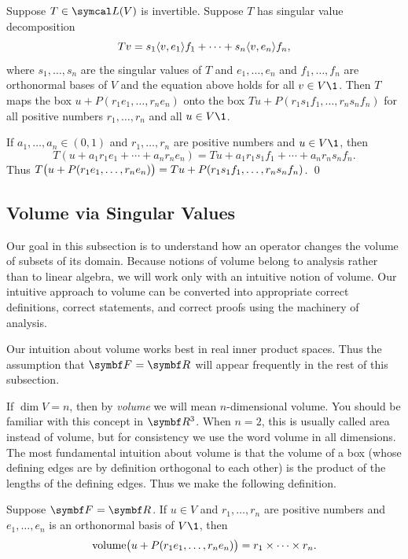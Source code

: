 \pagebreak[3]

{Suppose $T \in \L(V)$ is invertible. Suppose $T$ has singular value decomposition
\[
Tv = s_1 \ip{v, e_1} f_1 + \cdots + s_n \ip{v, e_n} f_n,
\]
where $s_1, \ldots, s_n$ are the singular values of $T$ and $e_1, \ldots, e_n$ and $f_1, \ldots, f_n$ are orthonormal bases of $V$ and the equation above holds for all $v \in V\1$. Then $T$ maps the box $u + P(r_1 e_1, \ldots, r_ne_n)$ onto the box
$Tu + P(r_1 s_1 f_1, \ldots, r_n s_n f_n)$ for all positive numbers $r_1, \ldots, r_n$ and all $u \in V\1$.}

\proof
If $a_1, \ldots, a_n \in (0, 1)$ and $r_1, \ldots, r_n$ are positive numbers and $u \in V\1$, then
\[
T(u + a_1 r_1  e_1 + \cdots + a_n r_n e_n) = Tu + a_1 r_1 s_1 f_1 + \cdots + a_n r_n s_n f_n.
\]
Thus  $T \paren[\big]{ u + P(r_1 e_1, \ldots, r_n e_n) } = Tu + P(r_1 s_1 f_1, \ldots, r_n s_n f_n)$.
\qed

\subsection{Volume via Singular Values}

Our goal in this subsection is to understand how an operator changes the volume of subsets of its domain. Because notions of volume belong to analysis rather than to linear algebra, we will work only with an intuitive notion of volume. Our intuitive approach to volume can be converted into appropriate correct definitions, correct statements, and correct proofs using the machinery of analysis.

Our intuition about volume works best in real inner product spaces. Thus the assumption that $\F{} = \R{}$ will appear frequently in the rest of this subsection.

If $\dim V = n$, then by \textit{volume} we will mean $n$-dimensional volume. You should be familiar with this concept in $\R3$. When $n=2$, this is usually called area instead of volume, but for consistency we use the word volume in all dimensions. The most fundamental intuition about volume is that the volume of a box (whose defining edges are by definition orthogonal to each other) is the product of the lengths of the defining edges. Thus we make the following definition.

{Suppose $\F{} = \R{}$. If $u \in V$ and $r_1, \ldots, r_n$ are positive numbers and $e_1, \ldots, e_n$ is an orthonormal basis of $V\1$, then
\[
\vol \paren[\big]{u + P(r_1 e_1, \ldots, r_n e_n)} = r_1 \times \cdots \times r_n.
\]}

